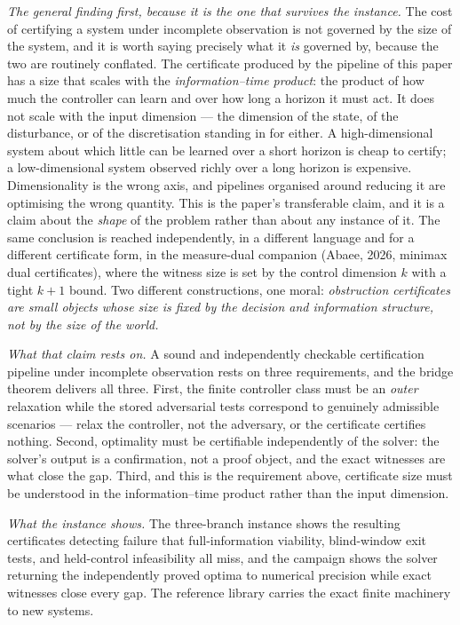 \documentclass[10pt,twocolumn]{article}
\theoremstyle{plain}
\theoremstyle{definition}
\theoremstyle{remark}
\begin{document}
\emph{The general finding first, because it is the one that survives the instance.} The cost of
certifying a system under incomplete observation is not governed by the size of the system, and it
is worth saying precisely what it \emph{is} governed by, because the two are routinely conflated.
The certificate produced by the pipeline of this paper has a size that scales with the
\emph{information--time product}: the product of how much the controller can learn and over how
long a horizon it must act. It does not scale with the input dimension --- the dimension of the
state, of the disturbance, or of the discretisation standing in for either. A high-dimensional
system about which little can be learned over a short horizon is cheap to certify; a
low-dimensional system observed richly over a long horizon is expensive. Dimensionality is the
wrong axis, and pipelines organised around reducing it are optimising the wrong quantity. This is
the paper's transferable claim, and it is a claim about the \emph{shape} of the problem rather
than about any instance of it. The same conclusion is reached independently, in a different
language and for a different certificate form, in the measure-dual companion (Abaee, 2026,
minimax dual certificates), where the witness size is set by the control dimension \(k\) with a
tight \(k+1\) bound. Two different constructions, one moral: \emph{obstruction certificates are
small objects whose size is fixed by the decision and information structure, not by the size of
the world.}

\emph{What that claim rests on.} A sound and independently checkable certification pipeline under
incomplete observation rests on three requirements, and the bridge theorem delivers all three.
First, the finite controller class must be an \emph{outer} relaxation while the stored adversarial
tests correspond to genuinely admissible scenarios --- relax the controller, not the adversary, or
the certificate certifies nothing. Second, optimality must be certifiable independently of the
solver: the solver's output is a confirmation, not a proof object, and the exact witnesses are
what close the gap. Third, and this is the requirement above, certificate size must be understood
in the information--time product rather than the input dimension.

\emph{What the instance shows.} The three-branch instance shows the resulting certificates
detecting failure that full-information viability, blind-window exit tests, and held-control
infeasibility all miss, and the campaign shows the solver returning the independently proved
optima to numerical precision while exact witnesses close every gap. The reference library carries
the exact finite machinery to new systems.
\end{document}
